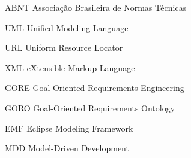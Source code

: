 \documentclass[
	12pt,				%
	openright,			%
	oneside,
	a4paper,			%
	english,			%
	french,				%
	spanish,			%
	brazil				%
	]{abntex2}
\begin{document}
\listoffigures*
\cleardoublepage


\listoftables*
\cleardoublepage


\begin{siglas}
  
  \item[ABNT] Associação Brasileira de Normas Técnicas

  \item[UML] Unified Modeling Language 

  \item[URL] Uniform Resource Locator
    
  \item[XML] eXtensible Markup Language
  
  \item[GORE] Goal-Oriented Requirements Engineering
  
  \item[GORO] Goal-Oriented Requirements Ontology
  
  \item[EMF] Eclipse Modeling Framework
  
  \item[MDD] Model-Driven Development
  
  
\end{siglas}



\tableofcontents*
\cleardoublepage




\textual









\end{document}
